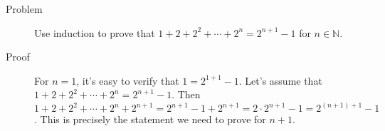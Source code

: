 \begin{description}
\item[Problem] Use induction to prove that $1 + 2 + 2^2 + \cdots + 2^n =
2^{n+1} - 1$ for $n \in \mathbb{N}$.

\item[Proof] For $n = 1$, it's easy to verify that $1 = 2^{1 + 1} - 1$. Let's
assume that $1 + 2 + 2^2 + \cdots + 2^n = 2^{n+1} - 1$. Then $1 + 2 + 2^2 +
\cdots + 2^n + 2^{n+1} = 2^{n+1} - 1 + 2^{n+1} = 2 \cdot 2^{n+1} - 1 = 2^{(n+1)
+1} - 1$. This is precisely the statement we need to prove for $n+1$.
\end{description}

